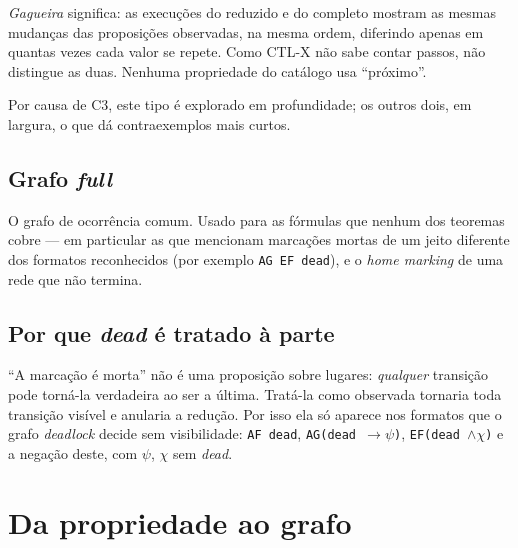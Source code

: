\documentclass[11pt,a4paper]{report}
\newcommand{\code}[1]{\texttt{\small #1}}
\theoremstyle{definition}
\begin{document}
\emph{Gagueira} significa: as execuções do reduzido e do completo mostram as
mesmas mudanças das proposições observadas, na mesma ordem, diferindo apenas
em quantas vezes cada valor se repete. Como CTL-X não sabe contar passos,
não distingue as duas. Nenhuma propriedade do catálogo usa ``próximo''.

Por causa de C3, este tipo é explorado em profundidade; os outros dois, em
largura, o que dá contraexemplos mais curtos.

\section{Grafo \emph{full}}

O grafo de ocorrência comum. Usado para as fórmulas que nenhum dos teoremas
cobre --- em particular as que mencionam marcações mortas de um jeito diferente
dos formatos reconhecidos (por exemplo \code{AG EF dead}), e o \emph{home
marking} de uma rede que não termina.

\section{Por que \emph{dead} é tratado à parte}

``A marcação é morta'' não é uma proposição sobre lugares: \emph{qualquer}
transição pode torná-la verdadeira ao ser a última. Tratá-la como observada
tornaria toda transição visível e anularia a redução. Por isso ela só aparece
nos formatos que o grafo \emph{deadlock} decide sem visibilidade:
\code{AF dead}, \code{AG(dead $\to\psi$)}, \code{EF(dead $\wedge\chi$)} e a
negação deste, com $\psi$, $\chi$ sem \emph{dead}.

\chapter{Da propriedade ao grafo}
\label{cap:pipeline}
\end{document}
